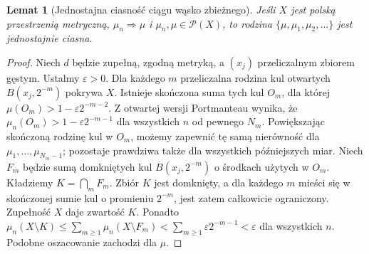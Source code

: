 \documentclass[11pt,a4paper,oneside]{book}
\numberwithin{equation}{chapter}
\theoremstyle{plain}
\newtheorem{lemat}[twierdzenie]{Lemat}
\theoremstyle{definition}
\theoremstyle{remark}
\begin{document}
\begin{lemat}[Jednostajna ciasność ciągu wąsko zbieżnego]
\label{lem:weak-sequence-tight-22}
Jeśli $X$ jest polską przestrzenią metryczną,
$\mu_n\Rightarrow\mu$ i $\mu_n,\mu\in\mathcal P(X)$,
to rodzina $\{\mu,\mu_1,\mu_2,\ldots\}$ jest
jednostajnie ciasna.
\end{lemat}
\begin{proof}
Niech $d$ będzie zupełną, zgodną metryką, a $(x_j)$
przeliczalnym zbiorem gęstym. Ustalmy $\varepsilon>0$.
Dla każdego $m$ przeliczalna rodzina kul otwartych
$B(x_j,2^{-m})$ pokrywa $X$. Istnieje skończona
suma tych kul $O_m$, dla której
$\mu(O_m)>1-\varepsilon2^{-m-2}$.
Z otwartej wersji Portmanteau wynika, że
$\mu_n(O_m)>1-\varepsilon2^{-m-1}$ dla wszystkich
$n$ od pewnego $N_m$.
Powiększając skończoną rodzinę kul w $O_m$,
możemy zapewnić tę samą nierówność dla
$\mu_1,\ldots,\mu_{N_m-1}$; pozostaje prawdziwa
także dla wszystkich późniejszych miar.
Niech $F_m$ będzie sumą domkniętych kul
$\overline B(x_j,2^{-m})$ o środkach użytych w $O_m$.
Kładziemy $K=\bigcap_mF_m$. Zbiór $K$ jest domknięty,
a dla każdego $m$ mieści się w skończonej sumie kul
o promieniu $2^{-m}$, jest zatem całkowicie ograniczony.
Zupełność $X$ daje zwartość $K$. Ponadto
$\mu_n(X\setminus K)\le\sum_{m\ge1}\mu_n(X\setminus F_m)
<\sum_{m\ge1}\varepsilon2^{-m-1}<\varepsilon$
dla wszystkich $n$. Podobne oszacowanie zachodzi dla $\mu$.
\end{proof}
\end{document}
